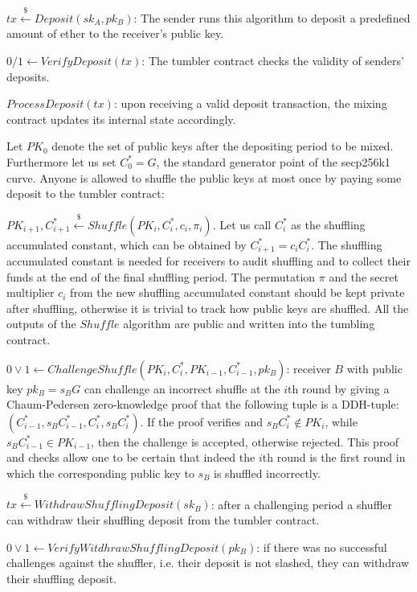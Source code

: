 \documentclass[conference, compsoc]{IEEEtran}
\theoremstyle{definition}
\begin{document}
$tx\stackrel{\$}{\leftarrow}Deposit(sk_A,pk_B)$: The sender runs this algorithm to deposit a predefined amount of ether to the receiver's public key.

$0/1\leftarrow VerifyDeposit(tx)$: The tumbler contract checks the validity of senders' deposits.

$ProcessDeposit(tx)$: upon receiving a valid deposit transaction, the mixing contract updates its internal state accordingly.

Let $PK_{0}$ denote the set of public keys after the depositing period to be mixed. Furthermore let us set $C^{*}_{0}=G$, the standard generator point of the secp256k1 curve. Anyone is allowed to shuffle the public keys at most once by paying some deposit to the tumbler contract: 

$PK_{i+1},C_{i+1}^{*}\stackrel{\$}{\leftarrow}Shuffle(PK_{i},C^{*}_{i},c_{i},\pi_{i})$. Let us call $C^{*}_{i}$ as the shuffling accumulated constant, which can be obtained by $C^{*}_{i+1}=c_{i}C^{*}_{i}$. The shuffling accumulated constant is needed for receivers to audit shuffling and to collect their funds at the end of the final shuffling period. The permutation $\pi$ and the secret multiplier $c_{i}$ from the new shuffling accumulated constant should be kept private after shuffling, otherwise it is trivial to track how public keys are shuffled. All the outputs of the $Shuffle$ algorithm are public and written into the tumbling contract.  

$0\lor1\leftarrow 
ChallengeShuffle(PK_{i},C^{*}_{i},PK_{i-1},C^{*}_{i-1},pk_{B})$: receiver $B$ with public key $pk_{B}=s_{B}G$ can challenge an incorrect shuffle at the $i$th round by giving a Chaum-Pedersen zero-knowledge proof that the following tuple is a DDH-tuple: $(C^{*}_{i-1}, s_{B}C^{*}_{i-1}, C^{*}_{i}, s_{B}C^{*}_{i})$. If the proof verifies and $s_{B}C^{*}_{i} \notin PK_{i}$, while $s_{B}C^{*}_{i-1} \in PK_{i-1}$, then the challenge is accepted, otherwise rejected. This proof and checks allow one to be certain that indeed the $i$th round is the first round in which the corresponding public key to $s_{B}$ is shuffled incorrectly.  

$tx\stackrel{\$}{\leftarrow}WithdrawShufflingDeposit(sk_B)$: after a challenging period a shuffler can withdraw their shuffling deposit from the tumbler contract.

$0\lor1\leftarrow VerifyWitdhrawShufflingDeposit(pk_B)$: if there was no successful challenges against the shuffler, i.e. their deposit is not slashed, they can withdraw their shuffling deposit. 
\end{document}
